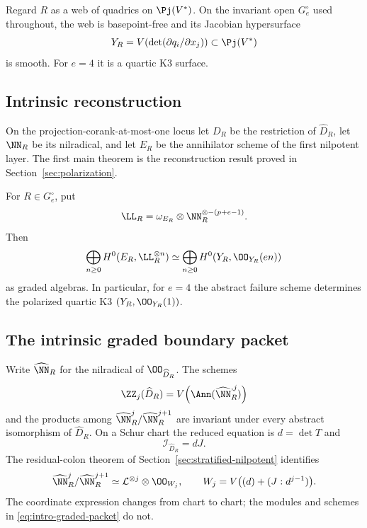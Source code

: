 Regard \(R\) as a web of quadrics on \(\Pj(V^*)\).  On the
invariant open \(G_e^\circ\) used throughout, the web is
basepoint-free and its Jacobian hypersurface
\begin{equation}\label{eq:Y-intro}
 Y_R=V\!\left(\det(\partial q_i/\partial x_j)\right)
 \subset\Pj(V^*)
\end{equation}
is smooth.  For \(e=4\) it is a quartic K3 surface.

\subsection{Intrinsic reconstruction}

On the projection-corank-at-most-one locus let \(D_R\) be the
restriction of \(\widehat D_R\), let \(\NN_R\) be its
nilradical, and let \(E_R\) be the annihilator scheme of the first
nilpotent layer.  The first main theorem is the reconstruction result
proved in Section~\ref{sec:polarization}.

\begin{theorem}
\label{thm:main-reconstruction}
For \(R\in G_e^\circ\), put
\[
 \LL_R=\omega_{E_R}\otimes
 \NN_R^{\otimes-(p+e-1)}.
\]
Then
\[
 \bigoplus_{n\ge0}H^0(E_R,\LL_R^{\otimes n})
 \simeq
 \bigoplus_{n\ge0}H^0(Y_R,\OO_{Y_R}(en))
\]
as graded algebras.  In particular, for \(e=4\) the abstract
failure scheme determines the polarized quartic K3
\((Y_R,\OO_{Y_R}(1))\).
\end{theorem}

\subsection{The intrinsic graded boundary packet}

Write \(\widehat\NN_R\) for the nilradical of
\(\OO_{\widehat D_R}\).  The schemes
\[
 \ZZ_j(\widehat D_R)=
 V\!\left(\Ann(\widehat\NN_R^{,j})\right)
\]
and the products among
\(\widehat\NN_R^j/\widehat\NN_R^{j+1}\) are invariant under
every abstract isomorphism of \(\widehat D_R\).  On a Schur chart
the reduced equation is \(d=\det T\) and
\[
 \mathcal I_{\widehat D_R}=dJ.
\]
The residual-colon theorem of Section~\ref{sec:stratified-nilpotent}
identifies
\begin{equation}\label{eq:intro-graded-packet}
 \widehat\NN_R^j/\widehat\NN_R^{j+1}
 \simeq
 \mathcal L^{\otimes j}\otimes\OO_{W_j},\qquad
 W_j=V\bigl((d)+(J:d^{j-1})\bigr).
\end{equation}
The coordinate expression changes from chart to chart; the modules
and schemes in \eqref{eq:intro-graded-packet} do not.

